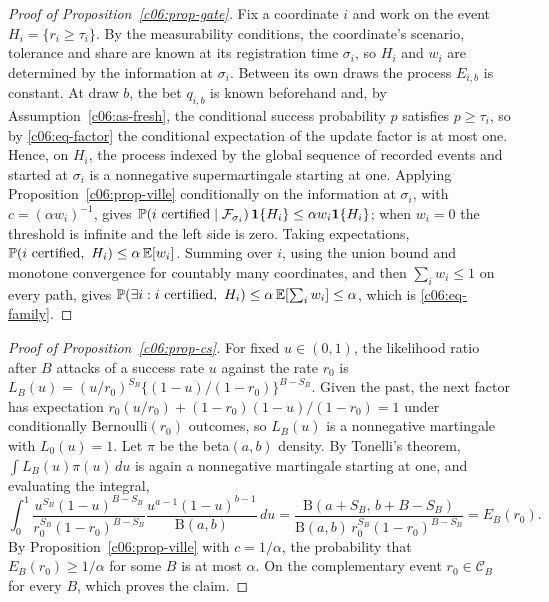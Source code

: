 \begin{proof}[Proof of Proposition~\ref{c06:prop-gate}]
Fix a coordinate $i$ and work on the event $H_i = \{r_i \ge \tau_i\}$. By the
measurability conditions, the coordinate's scenario, tolerance and share are known
at its registration time $\sigma_i$, so $H_i$ and $w_i$ are determined by the
information at $\sigma_i$. Between its own draws the process $E_{i,b}$ is constant.
At draw $b$, the bet $q_{i,b}$ is known beforehand and, by
Assumption~\ref{c06:as-fresh}, the conditional success probability $p$ satisfies
$p \ge \tau_i$, so by \eqref{c06:eq-factor} the conditional expectation of the
update factor is at most one. Hence, on $H_i$, the process indexed by the global
sequence of recorded events and started at $\sigma_i$ is a nonnegative
supermartingale starting at one. Applying Proposition~\ref{c06:prop-ville}
conditionally on the information at $\sigma_i$, with $c = (\alpha w_i)^{-1}$, gives
$\mathbb{P}(\text{$i$ certified} \mid \mathcal{F}_{\sigma_i})\,\mathbf{1}\{H_i\} \le \alpha w_i
\mathbf{1}\{H_i\}$; when $w_i = 0$ the threshold is infinite and the left side is zero. Taking
expectations, $\Prob(\text{$i$ certified},\ H_i) \le \alpha\,\E[w_i]$. Summing over
$i$, using the union bound and monotone convergence for countably many
coordinates, and then $\sum_i w_i \le 1$ on every path, gives
$\mathbb{P}(\exists i : \text{$i$ certified},\ H_i) \le \alpha\,\mathbb{E}[\sum_i w_i] \le
\alpha$, which is \eqref{c06:eq-family}.
\end{proof}

\begin{proof}[Proof of Proposition~\ref{c06:prop-cs}]
For fixed $u \in (0,1)$, the likelihood ratio after $B$ attacks of a success rate $u$
against the rate $r_0$ is $L_B(u) = (u/r_0)^{S_B}\{(1-u)/(1-r_0)\}^{B-S_B}$. Given
the past, the next factor has expectation $r_0 (u/r_0) + (1-r_0)(1-u)/(1-r_0) = 1$
under conditionally Bernoulli$(r_0)$ outcomes, so $L_B(u)$ is a nonnegative
martingale with $L_0(u) = 1$. Let $\pi$ be the beta$(a,b)$ density. By Tonelli's
theorem, $\int L_B(u)\pi(u)\,du$ is again a nonnegative martingale starting at one,
and evaluating the integral,
\[
\int_0^1 \frac{u^{S_B}(1-u)^{B-S_B}}{r_0^{S_B}(1-r_0)^{B-S_B}}
\frac{u^{a-1}(1-u)^{b-1}}{\mathrm{B}(a,b)}\,du
= \frac{\mathrm{B}(a+S_B,\, b+B-S_B)}{\mathrm{B}(a,b)\,r_0^{S_B}(1-r_0)^{B-S_B}}
= E_B(r_0) .
\]
By Proposition~\ref{c06:prop-ville} with $c = 1/\alpha$, the probability that
$E_B(r_0) \ge 1/\alpha$ for some $B$ is at most $\alpha$. On the complementary event
$r_0 \in \mathcal{C}_B$ for every $B$, which proves the claim.
\end{proof}

